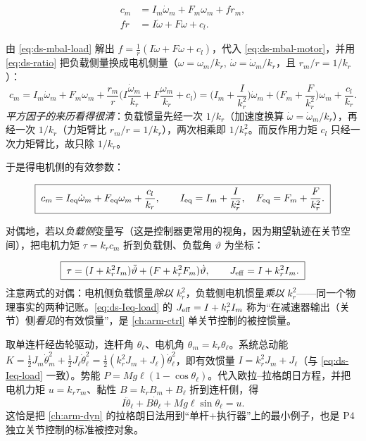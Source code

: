 \begin{align}
c_m &= I_m\dot\omega_m + F_m\omega_m + f r_m, \label{eq:ds-mbal-motor}\\
f r &= I\dot\omega + F\omega + c_l. \label{eq:ds-mbal-load}
\end{align}

\begin{derivation}
由 \cref{eq:ds-mbal-load} 解出 $f=\frac{1}{r}(I\dot\omega+F\omega+c_l)$，代入 \cref{eq:ds-mbal-motor}，并用 \cref{eq:ds-ratio} 把负载侧量换成电机侧量（$\omega=\omega_m/k_r,\ \dot\omega=\dot\omega_m/k_r$，且 $r_m/r=1/k_r$）：
\[
c_m = I_m\dot\omega_m + F_m\omega_m + \frac{r_m}{r}\Big(I\frac{\dot\omega_m}{k_r}+F\frac{\omega_m}{k_r}+c_l\Big)
     = \Big(I_m+\frac{I}{k_r^2}\Big)\dot\omega_m + \Big(F_m+\frac{F}{k_r^2}\Big)\omega_m + \frac{c_l}{k_r}.
\]
\emph{平方因子的来历看得很清}：负载惯量先经一次 $1/k_r$（加速度换算 $\dot\omega=\dot\omega_m/k_r$），再经一次 $1/k_r$（力矩臂比 $r_m/r=1/k_r$），两次相乘即 $1/k_r^2$。而反作用力矩 $c_l$ 只经一次力矩臂比，故只除 $1/k_r$。
\end{derivation}

于是得电机侧的有效参数：

\begin{equation}
\boxed{\;c_m=I_{\rm eq}\dot\omega_m+F_{\rm eq}\omega_m+\frac{c_l}{k_r},\qquad
I_{\rm eq}=I_m+\frac{I}{k_r^2},\quad F_{\rm eq}=F_m+\frac{F}{k_r^2}.\;}
\label{eq:ds-Ieq-motor}
\end{equation}

对偶地，若以\emph{负载侧}变量写（这是控制器更常用的视角，因为期望轨迹在关节空间），把电机力矩 $\tau=k_r c_m$ 折到负载侧、负载角 $\vartheta$ 为坐标：

\begin{equation}
\boxed{\;\tau=(I+k_r^2 I_m)\ddot\vartheta+(F+k_r^2 F_m)\dot\vartheta,\qquad J_{\rm eff}=I+k_r^2 I_m.\;}
\label{eq:ds-Ieq-load}
\end{equation}
注意两式的对偶：电机侧负载惯量\emph{除以} $k_r^2$，负载侧电机惯量\emph{乘以} $k_r^2$——同一个物理事实的两种记账。\cref{eq:ds-Ieq-load} 的 $J_{\rm eff}=I+k_r^2I_m$ 称为“在减速器输出（关节）侧\emph{看见}的有效惯量”，是 \cref{ch:arm-ctrl} 单关节控制的被控惯量\cite{craig2005introduction}。

\begin{example}[Spong 单连杆：用 $I=r^2J_m+J_\ell$ 写运动方程]
\label{ex:ds-spong-single}
取单连杆经齿轮驱动，连杆角 $\theta_\ell$、电机角 $\theta_m=k_r\theta_\ell$。系统总动能 $K=\tfrac12 J_m\dot\theta_m^2+\tfrac12 J_\ell\dot\theta_\ell^2=\tfrac12(k_r^2 J_m+J_\ell)\dot\theta_\ell^2$，即有效惯量 $I=k_r^2 J_m+J_\ell$（与 \cref{eq:ds-Ieq-load} 一致）。势能 $P=Mg\ell(1-\cos\theta_\ell)$。代入欧拉--拉格朗日方程，并把电机力矩 $u=k_r\tau_m$、黏性 $B=k_r B_m+B_\ell$ 折到连杆侧，得
\begin{equation}
I\ddot\theta_\ell+B\dot\theta_\ell+Mg\ell\sin\theta_\ell=u.
\label{eq:ds-spong-eom}
\end{equation}
这恰是把 \cref{ch:arm-dyn} 的拉格朗日法用到“单杆$+$执行器”上的最小例子，也是 P4 独立关节控制的标准被控对象\cite{spong2006robot}。
\end{example}

